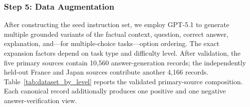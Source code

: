 \documentclass[a4paper,fleqn]{cas-sc}
\begin{document}
\subsubsection{Step 5: Data Augmentation}

After constructing the seed instruction set, we employ GPT\mbox{-}5.1 to generate multiple grounded variants of the factual context, question, correct answer, explanation, and---for multiple-choice tasks---option ordering. The exact expansion factors depend on task type and difficulty level. After validation, the five primary sources contain 10,560 answer-generation records; the independently held-out France and Japan sources contribute another 4,166 records. Table~\ref{tab:dataset_by_level} reports the validated primary-source composition. Each canonical record additionally produces one positive and one negative answer-verification view.

\begin{table}[H]
\centering
\caption{Validated answer-generation records from the five primary sources, reported by difficulty level and task type. France and Japan are excluded because they are reserved as cross-regional holdouts.}
\label{tab:dataset_by_level}
\end{table}
\end{document}
